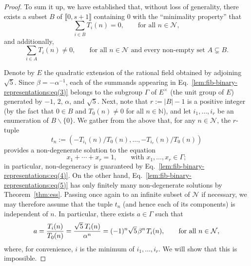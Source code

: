 \documentclass[11pt,reqno]{amsart}
\theoremstyle{definition}
\theoremstyle{remark}
\theoremstyle{theoremdd}
\providecommand\llb{\llbracket}
\providecommand\rrb{\rrbracket}
\providecommand\llb{\llbracket}
\providecommand\rrb{\rrbracket}
\renewcommand{\setminus}{\smallsetminus}
\renewcommand{\,}{\kern 0.1em}
\begin{document}
\begin{proof}
To sum it up, we have established that, without loss of generality, there exists a subset $B$ of $\llb 0, s + 1 \rrb$ containing $0$ with the ``minimality property'' that
\begin{equation}
\label{lem:fib-binary-representations:eq(3)}
\sum_{i \in B} T_i(n) = 0, 
\qquad\text{for all } n \in \mathcal N,
\end{equation}
and additionally,
\begin{equation}
\label{lem:fib-binary-representations:eq(4)}
\sum_{i \in A} T_i(n) \ne 0,
\qquad \text{for all }n \in \mathcal N \text{ and every non-empty set } A \subsetneq B.
\end{equation}

Denote by $E$ the quadratic extension of the rational field obtained by adjoining $\sqrt{5}$. Since
$\beta = \allowbreak -\alpha^{-1}$, each of the summands appearing in Eq.~\eqref{lem:fib-binary-representations:eq(3)} belongs to the subgroup $\Gamma$ of $E^\times$ (the unit group of $E$) generated by $-1$, $2$, $\alpha$, and $\sqrt 5$. 
Next, note that $r := |B| - 1$ is a positive integer (by the fact that $0 \in B$ and $T_0(n) \ne 0$ for all $n \in \mathbb N$), and let $i_1, \ldots, i_r$ be an enumeration of $B \setminus \{0\}$.
We gather from the above that, for any $n \in \mathcal N$, the $r$-tuple 
\[
t_n := (-T_{i_1}(n)/T_0(n), \ldots, -T_{i_r}(n)/T_0(n))
\]
provides a non-degenerate solution to the equation 
\begin{equation}
\label{lem:fib-binary-representations:eq(5)}
x_1 + \cdots + x_r = 1, \qquad
\text{with } x_1, \ldots, x_r \in \Gamma;
\end{equation}
in particular, non-degeneracy is guaranteed by Eq.~\eqref{lem:fib-binary-representations:eq(4)}. On the other hand, Eq.~\eqref{lem:fib-binary-representations:eq(5)} has only finitely many non-degenerate solutions by Theorem~\ref{thm:ess}. Passing once again to an infinite subset of $\mathcal N$ if necessary, we may therefore assume that the tuple $t_n$ (and hence each of its components) is independent of $n$. In particular, there exists $a \in \Gamma$ such that
\begin{equation}
\label{lem:fib-binary-representations:eq(6)}
a = \frac{T_i(n)}{T_0(n)} = \frac{\sqrt{5} \: T_i(n)}{\alpha^n} = (-1)^n \sqrt{5} \, \beta^n\, T_i(n),
\qquad
\text{for all } n \in \mathcal N,
\end{equation}
where, for convenience, $i$ is the minimum of $i_1, \ldots, i_r$. We will show that this is impossible.


\end{proof}
\end{document}
